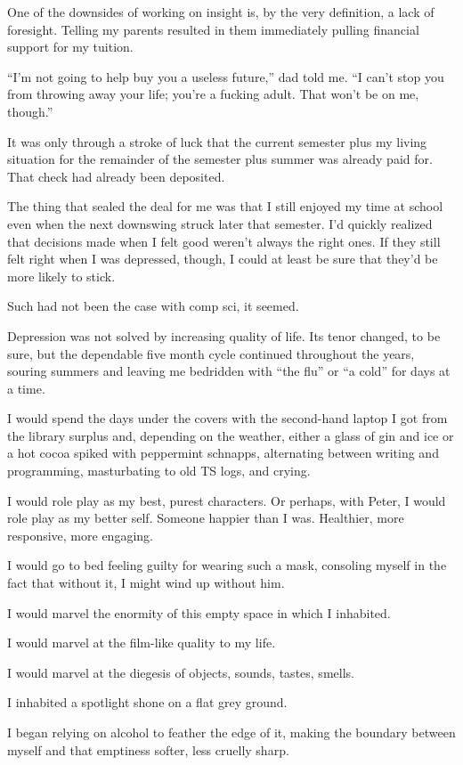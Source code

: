 One of the downsides of working on insight is, by the very definition, a lack of foresight. Telling my parents resulted in them immediately pulling financial support for my tuition.

``I'm not going to help buy you a useless future,'' dad told me. ``I can't stop you from throwing away your life; you're a fucking adult. That won't be on me, though.''

It was only through a stroke of luck that the current semester plus my living situation for the remainder of the semester plus summer was already paid for. That check had already been deposited.

The thing that sealed the deal for me was that I still enjoyed my time at school even when the next downswing struck later that semester. I'd quickly realized that decisions made when I felt good weren't always the right ones. If they still felt right when I was depressed, though, I could at least be sure that they'd be more likely to stick.

Such had not been the case with comp sci, it seemed.

Depression was not solved by increasing quality of life. Its tenor changed, to be sure, but the dependable five month cycle continued throughout the years, souring summers and leaving me bedridden with ``the flu'' or ``a cold'' for days at a time.

I would spend the days under the covers with the second-hand laptop I got from the library surplus and, depending on the weather, either a glass of gin and ice or a hot cocoa spiked with peppermint schnapps, alternating between writing and programming, masturbating to old TS logs, and crying.

I would role play as my best, purest characters. Or perhaps, with Peter, I would role play as my better self. Someone happier than I was. Healthier, more responsive, more engaging.

I would go to bed feeling guilty for wearing such a mask, consoling myself in the fact that without it, I might wind up without him.

I would marvel the enormity of this empty space in which I inhabited.

I would marvel at the film-like quality to my life.

I would marvel at the diegesis of objects, sounds, tastes, smells.

I inhabited a spotlight shone on a flat grey ground.

I began relying on alcohol to feather the edge of it, making the boundary between myself and that emptiness softer, less cruelly sharp.

